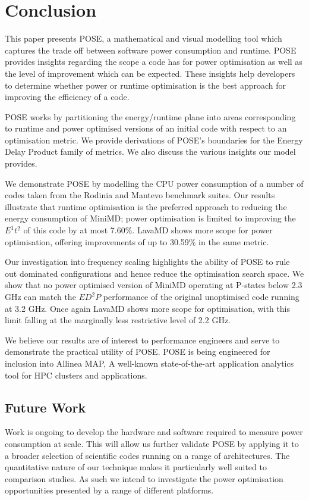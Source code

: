\section{Conclusion}
\label{sec:conclusion}
\noindent
This paper presents POSE, a mathematical and visual modelling tool which captures the trade off between software power consumption and runtime.
POSE provides insights regarding the scope a code has for power optimisation as well as the level of improvement which can be expected.
These insights help developers to determine whether power or runtime optimisation is the best approach for improving the efficiency of a code.

POSE works by partitioning the energy/runtime plane into areas corresponding to runtime and power optimised versions of an initial code with respect to an optimisation metric.
We provide derivations of POSE's boundaries for the Energy Delay Product family of metrics.
We also discuss the various insights our model provides.

We demonstrate POSE by modelling the CPU power consumption of a number of codes taken from the Rodinia and Mantevo benchmark suites.  
Our results illustrate that runtime optimisation is the preferred approach to reducing the energy consumption of MiniMD; power optimisation is limited to improving the $E^1t^2$ of this code by at most 7.60\%.
LavaMD shows more scope for power optimisation, offering improvements of up to 30.59\% in the same metric. 

Our investigation into frequency scaling highlights the ability of POSE to rule out dominated configurations and hence reduce the optimisation search space.
We show that no power optimised version of MiniMD operating at P-states below 2.3 GHz can match the $ED^2P$ performance of the original unoptimised code running at 3.2 GHz.
Once again LavaMD shows more scope for optimisation, with this limit falling at the marginally less restrictive level of 2.2 GHz.

We believe our results are of interest to performance engineers and serve to demonstrate the practical utility of POSE.
POSE is being engineered for inclusion into Allinea MAP, A well-known state-of-the-art application analytics tool for HPC clusters and applications.

\subsection*{Future Work}
\noindent
Work is ongoing to develop the hardware and software required to measure power consumption at scale.
This will allow us further validate POSE by applying it to a broader selection of scientific codes running on a range of architectures.
The quantitative nature of our technique makes it particularly well suited to comparison studies.
As such we intend to investigate the power optimisation opportunities presented by a range of different platforms.

